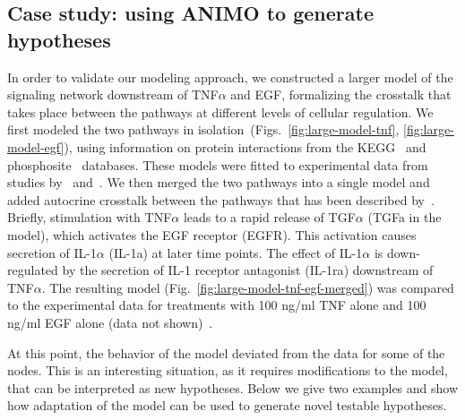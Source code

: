 \subsection{Case study: using ANIMO to generate hypotheses}\label{subsec:case-study-larger}
In order to validate our modeling approach,
we constructed a larger model of the signaling network downstream of TNF$\alpha$ and EGF, formalizing 
the crosstalk that takes place between the pathways at different levels of cellular regulation.
We first modeled the two pathways in isolation~(Figs.~\ref{fig:large-model-tnf}, \ref{fig:large-model-egf}),
using information on protein interactions from
the KEGG~\citep{kegg} and phosphosite~\citep{phosphosite} databases. These models were fitted to experimental data
from studies by~\citet{pathway-compendium} and~\citet{pathway-autocrine}.
We then merged the two pathways into a single model and added autocrine crosstalk between the pathways that has been
described by~\citet{pathway-autocrine}.
Briefly, stimulation with TNF$\alpha$ leads to a rapid release of TGF$\alpha$ ({\sf TGFa} in the model), 
which activates the EGF receptor ({\sf EGFR}).
This activation causes secretion of IL-1$\alpha$ ({\sf IL-1a}) at later time points.
The effect of IL-1$\alpha$ is down-regulated by the secretion of IL-1 receptor antagonist ({\sf IL-1ra}) 
downstream of TNF$\alpha$.
The resulting model (Fig.~\ref{fig:large-model-tnf-egf-merged}) was compared to the experimental data 
for treatments with 100 ng/ml TNF alone and 100 ng/ml EGF alone (data not shown)~\citep{pathway-compendium}.

At this point, the behavior of the model deviated from the data for some of the nodes.
This is an interesting situation, as it requires
modifications to the model, that can be interpreted as new hypotheses. Below we give two examples and show how
adaptation of the model can be used to generate novel testable hypotheses.



